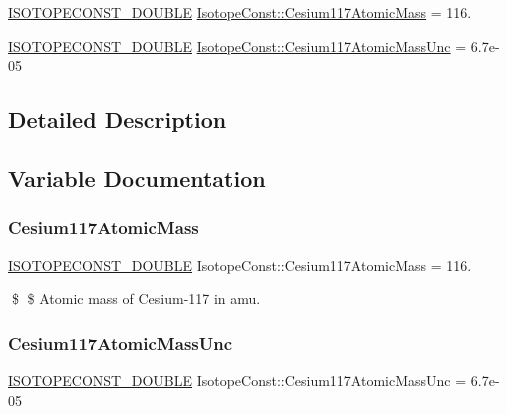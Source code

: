 \begin{DoxyCompactItemize}
\item 
\mbox{\hyperlink{group___isotope_const-_macros_ga8f45a7272ce02c0b4c65c44636ed719a}{I\+S\+O\+T\+O\+P\+E\+C\+O\+N\+S\+T\+\_\+\+D\+O\+U\+B\+LE}} \mbox{\hyperlink{group___isotope_const-_cesium-_cs117_gaf141ab724d8f49866a65f3ad74b893b4}{Isotope\+Const\+::\+Cesium117\+Atomic\+Mass}} = 116.
\item 
\mbox{\hyperlink{group___isotope_const-_macros_ga8f45a7272ce02c0b4c65c44636ed719a}{I\+S\+O\+T\+O\+P\+E\+C\+O\+N\+S\+T\+\_\+\+D\+O\+U\+B\+LE}} \mbox{\hyperlink{group___isotope_const-_cesium-_cs117_ga1a72c6394bff268f68bdc5ff36355f5a}{Isotope\+Const\+::\+Cesium117\+Atomic\+Mass\+Unc}} = 6.\+7e-\/05
\end{DoxyCompactItemize}


\subsection{Detailed Description}


\subsection{Variable Documentation}
\mbox{\label{group___isotope_const-_cesium-_cs117_gaf141ab724d8f49866a65f3ad74b893b4}} 
\subsubsection{\texorpdfstring{Cesium117\+Atomic\+Mass}{Cesium117AtomicMass}}
{\footnotesize\ttfamily \mbox{\hyperlink{group___isotope_const-_macros_ga8f45a7272ce02c0b4c65c44636ed719a}{I\+S\+O\+T\+O\+P\+E\+C\+O\+N\+S\+T\+\_\+\+D\+O\+U\+B\+LE}} Isotope\+Const\+::\+Cesium117\+Atomic\+Mass = 116.}

\$ \$ Atomic mass of Cesium-\/117 in amu. \mbox{\label{group___isotope_const-_cesium-_cs117_ga1a72c6394bff268f68bdc5ff36355f5a}} 
\subsubsection{\texorpdfstring{Cesium117\+Atomic\+Mass\+Unc}{Cesium117AtomicMassUnc}}
{\footnotesize\ttfamily \mbox{\hyperlink{group___isotope_const-_macros_ga8f45a7272ce02c0b4c65c44636ed719a}{I\+S\+O\+T\+O\+P\+E\+C\+O\+N\+S\+T\+\_\+\+D\+O\+U\+B\+LE}} Isotope\+Const\+::\+Cesium117\+Atomic\+Mass\+Unc = 6.\+7e-\/05}

